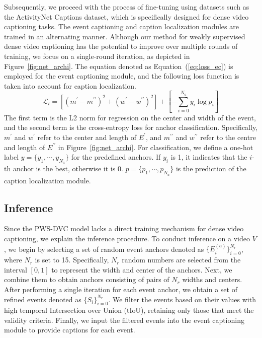 Subsequently, we proceed with the process of fine-tuning using datasets such as the ActivityNet Captions dataset, which is specifically designed for dense video captioning tasks.
The event captioning and caption localization modules are trained in an alternating manner.
Although our method for weakly supervised dense video captioning has the potential to improve over multiple rounds of training, we focus on a single-round iteration, as depicted in Figure~\ref{fig:net_archi}.
The equation denoted as Equation~(\ref{eq:loss_ec}) is employed for the event captioning module, and the following loss function is taken into account for caption localization.
\begin{equation}
    \mathcal{L}_l=\left[ \left( m^{\prime} - m^{\prime \prime}\right)^2 + \left( w^{\prime} - w^{\prime \prime} \right)^2 \right] + \left[ -\sum_{i=0}^{N_a} y_i \log p_i \right]
    \label{eq:loss_cl}
\end{equation}
The first term is the L2 norm for regression on the center and width of the event, and the second term is the cross-entropy loss for anchor classification.
Specifically, $m^{\prime}$ and $w^{\prime}$ refer to the center and length of $E^{\prime}$, and $m^{\prime \prime}$ and $w^{\prime \prime}$ refer to the centre and length of $E^{\prime \prime}$ in Figure~\ref{fig:net_archi}.
For classification, we define a one-hot label $y = \{y_1, \cdots, y_{N_a} \}$ for the predefined anchors.
If $y_i$ is 1, it indicates that the $i$-th anchor is the best, otherwise it is 0.
$p = \{p_1, \cdots, p_{N_a} \}$ is the prediction of the caption localization module.


\subsection{Inference}
Since the PWS-DVC model lacks a direct training mechanism for dense video captioning, we explain the inference procedure.
To conduct inference on a video $V$, we begin by selecting a set of random event anchors denoted as $\{E_i^{(a)}\}_{i=0}^{N_r}$, where $N_r$ is set to 15.
Specifically, $N_r$ random numbers are selected from the interval $[0, 1]$ to represent the width and center of the anchors.
Next, we combine them to obtain anchors consisting of pairs of $N_r$ widths and centers.
After performing a single iteration for each event anchor, we obtain a set of refined events denoted as $\{S_i\}_{i=0}^{N_r}$.
We filter the events based on their values with high temporal Intersection over Union (tIoU), retaining only those that meet the validity criteria.
Finally, we input the filtered events into the event captioning module to provide captions for each event.

